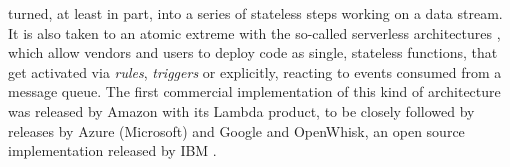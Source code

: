 \documentclass{llncs}
\begin{document}
  turned, at least in part, into a series of stateless steps working on a data stream.
    It is also taken to an atomic extreme
    with the so-called serverless architectures \cite{Varghese2018849},
    which allow vendors and users to deploy code as single, stateless
    functions, that get activated via {\em rules}, {\em triggers} or
    explicitly, reacting to events consumed from
    a message queue.
    The first commercial
    implementation of this kind of architecture was released by Amazon
    with its Lambda product, to be closely followed by releases by Azure
    (Microsoft) and Google and OpenWhisk, an open source implementation
    released by IBM \cite{Baldini2016287}.



\end{document}

